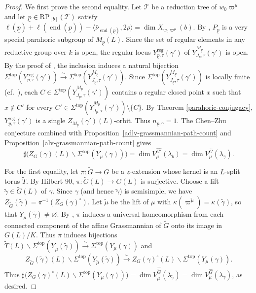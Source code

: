 \documentclass[12pt]{article}
\DeclareMathOperator{\en}{end}
\newcommand\tp{\mathrm{top}}
\newcommand\unp{\underline p}
\newcommand\vp{\varpi}
\theoremstyle{definition}
\newcommand{\reg}{\mathrm{reg}}
\begin{document}
\begin{proof}
We first prove the second equality.
Let $\mathcal T$ be a reduction tree of $w_0\vp^\mu$ and let $\unp\in\mathrm{RP}_{[b]}(\mathcal T)$ satisfy $\ell(\unp)+\ell(\en(\unp))-\langle\bar\nu_{\en(\unp)},2\rho\rangle=\dim X_{w_0\vp^\mu}(b)$.
By \cite[Proposition 3.1]{He25}, $P_{\unp}$ is a very special parahoric subgroup of $M_{\unp}(L)$.
Since the set of regular elements in any reductive group over $k$ is open, the regular locus $Y_{\unp,\tau}^{\reg}(\gamma')$ of $Y^{M_{\unp}}_{J_{\unp},\tau}(\gamma')$ is open.
By the proof of \cite[Proposition 2.7]{He25}, the inclusion induces a natural bijection $\Sigma^{\tp}(Y_{\unp,\tau}^{\reg}(\gamma'))\xrightarrow{\sim}\Sigma^{\tp}(Y^{M_{\unp}}_{J_{\unp},\tau}(\gamma'))$.
Since $\Sigma^{\tp}(Y^{M_{\unp}}_{J_{\unp},\tau}(\gamma'))$ is locally finite (cf.\ \cite[Theorem 6.10]{Chi26}), each $C\in\Sigma^{\tp}(Y^{M_{\unp}}_{J_{\unp},\tau}(\gamma'))$ contains a regular closed point $x$ such that $x\notin C'$ for every $C'\in\Sigma^{\tp}(Y^{M_{\unp}}_{J_{\unp},\tau}(\gamma'))\setminus\{C\}$.
By Theorem \ref{parahoric-conjugacy}, $Y_{\unp,\tau}^{\reg}(\gamma')$ is a single $Z_{M_{\unp}}(\gamma')(L)$-orbit.
Thus $n_{\unp,\gamma}=1$.
The Chen--Zhu conjecture combined with Proposition~\ref{adlv-grassmannian-path-count} and Proposition~\ref{alv-grassmannian-path-count} gives
\begin{equation*}
\sharp\bigl(Z_G(\gamma)(L)\backslash\Sigma^{\tp}(Y_\mu(\gamma))\bigr)
=\dim V_\mu^{\widehat{G'}}(\lambda_b)
=\dim V_\mu^{\widehat G}(\lambda_\gamma).
\end{equation*}

For the first equality, let $\pi\colon\widetilde G\to G$ be a $z$-extension whose kernel is an $L$-split torus $\widetilde T$.
By Hilbert 90, $\pi\colon\widetilde G(L)\to G(L)$ is surjective.
Choose a lift $\widetilde\gamma\in\widetilde G(L)$ of $\gamma$.
Since $\gamma$ (and hence $\widetilde\gamma$) is semisimple, we have $Z_{\widetilde G}(\widetilde\gamma)=\pi^{-1}(Z_G(\gamma)^\circ)$.
Let $\widetilde\mu$ be the lift of $\mu$ with $\kappa(\vp^{\widetilde\mu})=\kappa(\widetilde\gamma)$, so that $Y_{\widetilde\mu}(\widetilde\gamma)\ne\varnothing$.
By \cite[Proposition 3.1]{HV18}, $\pi$ induces a universal homeomorphism from each connected component of the affine Grassmannian of $\widetilde G$ onto its image in $G(L)/K$.
Thus $\pi$ induces bijections $\widetilde T(L)\backslash\Sigma^{\tp}(Y_{\widetilde\mu}(\widetilde\gamma))\xrightarrow{\sim}\Sigma^{\tp}(Y_\mu(\gamma))$ and
$$
Z_{\widetilde G}(\widetilde\gamma)(L)\backslash\Sigma^{\tp}(Y_{\widetilde\mu}(\widetilde\gamma))
\xrightarrow{\sim} Z_G(\gamma)^\circ(L)\backslash\Sigma^{\tp}(Y_\mu(\gamma)).
$$
Thus $\sharp\bigl(Z_G(\gamma)^\circ(L)\backslash\Sigma^{\tp}(Y_\mu(\gamma))\bigr)=\dim V_{\widetilde\mu}^{\widehat{\widetilde G}}(\lambda_{\widetilde\gamma})=\dim V_\mu^{\widehat G}(\lambda_\gamma)$, as desired.
\end{proof}


\end{document}
